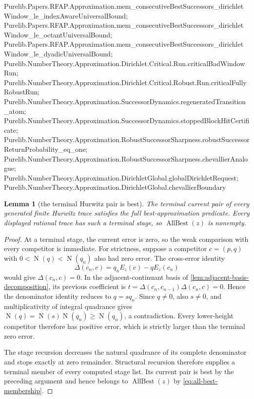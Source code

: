 \documentclass[11pt]{article}
\newtheorem{lemma}[lemma]{Lemma}
\newcommand{\Norm}[1]{\operatorname{N}\!\left(#1\right)}
\begin{document}
{Purelib.Papers.RFAP.Approximation.mem_consecutiveBestSuccessors_dirichletWindow_le_indexAwareUniversalBound;
Purelib.Papers.RFAP.Approximation.mem_consecutiveBestSuccessors_dirichletWindow_le_octantUniversalBound;
Purelib.Papers.RFAP.Approximation.mem_consecutiveBestSuccessors_dirichletWindow_le_dyadicUniversalBound;
Purelib.NumberTheory.Approximation.Dirichlet.Critical.Run.criticalBadWindowRun;
Purelib.NumberTheory.Approximation.Dirichlet.Critical.Robust.Run.criticalFullyRobustRun;
Purelib.NumberTheory.Approximation.SuccessorDynamics.regeneratedTransition_atom;
Purelib.NumberTheory.Approximation.SuccessorDynamics.stoppedBlockHitCertificate;
Purelib.NumberTheory.Approximation.RobustSuccessorSharpness.robustSuccessorReturnProbability_eq_one;
Purelib.NumberTheory.Approximation.RobustSuccessorSharpness.chevallierAnalogue;
Purelib.NumberTheory.Approximation.DirichletGlobal.globalDirichletRequest;
Purelib.NumberTheory.Approximation.DirichletGlobal.chevallierBoundary}

\begin{lemma}[the terminal Hurwitz pair is best]
\label{lem:terminal-hurwitz-best}
The terminal current pair of every generated finite Hurwitz trace satisfies
the full best-approximation predicate.  Every displayed rational trace has
such a terminal stage, so $\operatorname{AllBest}(z)$ is nonempty.
\end{lemma}

\begin{proof}
At a terminal stage, the current error is zero, so the weak comparison with
every competitor is immediate.  For strictness, suppose a competitor
$c=(p,q)$ with $0<\Norm q<\Norm{q_n}$ also had zero error.  The cross-error
identity
\[
 \Delta(c_n,c)=q_nE_z(c)-qE_z(c_n)
\]
would give $\Delta(c_n,c)=0$.  In the adjacent-continuant basis of
\cref{lem:adjacent-basis-decomposition}, its previous coefficient is
$t=\Delta(c_n,c_{n-1})\Delta(c_n,c)=0$.  Hence the denominator identity
reduces to $q=sq_n$.  Since $q\ne0$, also $s\ne0$, and multiplicativity of
integral quadrance gives $\Norm q=\Norm s\Norm{q_n}\ge\Norm{q_n}$, a
contradiction.  Every lower-height competitor therefore has positive error,
which is strictly larger than the terminal zero error.

The stage recursion decreases the natural quadrance of its complete
denominator and stops exactly at zero remainder.  Structural recursion
therefore supplies a terminal member of every computed stage list.  Its
current pair is best by the preceding argument and hence belongs to
$\operatorname{AllBest}(z)$ by
\eqref{eq:all-best-membership}.
\end{proof}
\end{document}
